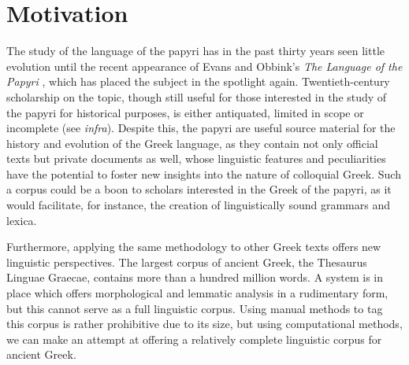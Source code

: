 
\section{Motivation}

The study of the language of the papyri has in the past thirty years
seen little evolution until the recent appearance of Evans and Obbink's
\textit{The Language of the Papyri} \citep{lpapyri}, which has placed
the subject in the spotlight again. Twentieth-century scholarship on the
topic, though still useful for those interested in the study of the
papyri for historical purposes, is either antiquated, limited in scope
or incomplete (see \textit{infra}). Despite this, the papyri are
useful source material for the history and evolution of the Greek
language, as they contain not only official texts but private
documents as well, whose linguistic features and peculiarities have
the potential to foster new insights into the nature of colloquial
Greek. Such a corpus could be a boon to scholars interested in the
Greek of the papyri, as it would facilitate, for instance, the
creation of linguistically sound grammars and lexica.

Furthermore, applying the same methodology to other Greek texts offers
new linguistic perspectives. The largest corpus of ancient Greek, the
Thesaurus Linguae Graecae, contains more than a hundred million words.
A system is in place which offers morphological and lemmatic analysis
in a rudimentary form, but this cannot serve as a full linguistic
corpus. Using manual methods to tag this corpus is rather prohibitive
due to its size, but using computational methods, we can make an
attempt at offering a relatively complete linguistic corpus for
ancient Greek.

